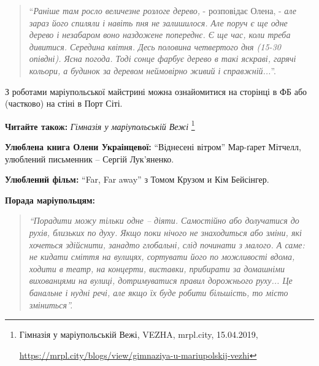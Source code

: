 \begin{quote}
\enquote{\emph{Раніше
там росло величезне розлоге дерево,} - розповідає Олена, - \em але зараз його
спиляли і навіть пня не залишилося. Але поруч є ще одне дерево і незабаром воно
наздожене попереднє. Є ще час, коли треба дивитися. Середина квітня. Десь
половина четвертого дня (15-30 опівдні). Ясна погода. Тоді сонце фарбує дерево
в такі яскраві, гарячі кольори, а будинок за деревом неймовірно живий і
справжній...}.
\end{quote}

З роботами маріупольської майстрині можна ознайомитися на сторінці в ФБ або
(частково) на стіні в Порт Сіті.

\textbf{Читайте також:} \emph{Гімназія у маріупольській Вежі}%
\footnote{Гімназія у маріупольській Вежі, VEZHA, mrpl.city, 15.04.2019, \par%
\url{https://mrpl.city/blogs/view/gimnaziya-u-mariupolskij-vezhi}
}


\textbf{Улюблена книга Олени Украінцевої:} \enquote{Віднесені вітром} Мар\hyp{}ґарет Мітчелл, улюблений письменник – Сергій Лук'яненко.

\textbf{Улюблений фільм:} \enquote{Far, Far away} з Томом Крузом и Кім Бейсінгер.

\textbf{Порада маріупольцям:} 

\begin{quote}
\em\enquote{Порадити можу тільки одне – діяти. Самостійно або долучатися до рухів,
близьких по духу. Якщо поки нічого не знаходиться або зміни, які хочеться
здійснити, занадто глобальні, слід починати з малого. А саме: не кидати сміття
на вулицях, сортувати його по можливості вдома, ходити в театр, на концерти,
виставки, прибирати за домашніми вихованцями на вулиці, дотримуватися правил
дорожнього руху... Це банальне і нудні речі, але якщо їх буде робити більшість,
то місто зміниться}.
\end{quote}

